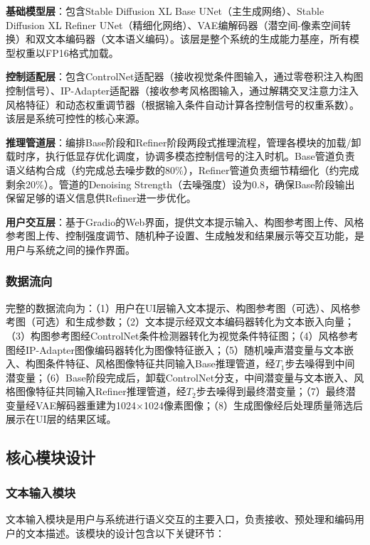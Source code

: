 \documentclass[12pt,a4paper]{ctexart}
\newcommand{\sdxl}{Stable Diffusion XL}
\newcommand{\controlnet}{ControlNet}
\newcommand{\ipadapter}{IP-Adapter}
\begin{document}
\textbf{基础模型层}：包含\sdxl{} Base UNet（主生成网络）、\sdxl{} Refiner UNet（精细化网络）、VAE编解码器（潜空间-像素空间转换）和双文本编码器（文本语义编码）。该层是整个系统的生成能力基座，所有模型权重以FP16格式加载。

\textbf{控制适配层}：包含\controlnet{}适配器（接收视觉条件图输入，通过零卷积注入构图控制信号）、\ipadapter{}适配器（接收参考风格图输入，通过解耦交叉注意力注入风格特征）和动态权重调节器（根据输入条件自动计算各控制信号的权重系数）。该层是系统可控性的核心来源。

\textbf{推理管道层}：编排Base阶段和Refiner阶段两段式推理流程，管理各模块的加载/卸载时序，执行低显存优化调度，协调多模态控制信号的注入时机。Base管道负责语义结构合成（约完成总去噪步数的80\%），Refiner管道负责细节精细化（约完成剩余20\%）。管道的Denoising Strength（去噪强度）设为0.8，确保Base阶段输出保留足够的语义信息供Refiner进一步优化。

\textbf{用户交互层}：基于Gradio的Web界面，提供文本提示输入、构图参考图上传、风格参考图上传、控制强度调节、随机种子设置、生成触发和结果展示等交互功能，是用户与系统之间的操作界面。

\subsubsection{数据流向}

完整的数据流向为：（1）用户在UI层输入文本提示、构图参考图（可选）、风格参考图（可选）和生成参数；（2）文本提示经双文本编码器转化为文本嵌入向量；（3）构图参考图经\controlnet{}条件检测器转化为视觉条件特征图；（4）风格参考图经\ipadapter{}图像编码器转化为图像特征嵌入；（5）随机噪声潜变量与文本嵌入、构图条件特征、风格图像特征共同输入Base推理管道，经$T_1$步去噪得到中间潜变量；（6）Base阶段完成后，卸载\controlnet{}分支，中间潜变量与文本嵌入、风格图像特征共同输入Refiner推理管道，经$T_2$步去噪得到最终潜变量；（7）最终潜变量经VAE解码器重建为1024$\times$1024像素图像；（8）生成图像经后处理质量筛选后展示在UI层的结果区域。

\subsection{核心模块设计}

\subsubsection{文本输入模块}

文本输入模块是用户与系统进行语义交互的主要入口，负责接收、预处理和编码用户的文本描述。该模块的设计包含以下关键环节：
\end{document}
